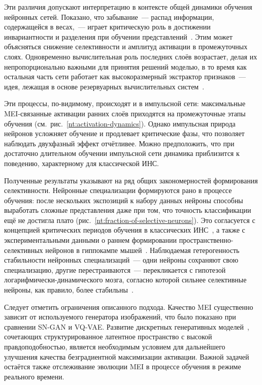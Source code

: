 Эти различия допускают интерпретацию в контексте общей динамики обучения нейронных сетей. Показано, что забывание~--- распад информации, содержащейся в весах,~--- играет критическую роль в достижении инвариантности и разделения при обучении представлений~\cite{critical-learning-periods}. Этим может объясняться снижение селективности и амплитуд активации в промежуточных слоях. Одновременно вычислительная роль последних слоёв возрастает, делая их непропорционально важными для принятия решений моделью, в то время как остальная часть сети работает как высокоразмерный экстрактор признаков~--- идея, лежащая в основе резервуарных вычислительных систем~\cite{Gauthier2021}.

Эти процессы, по-видимому, происходят и в импульсной сети: максимальные MEI-связанные активации ранних слоёв приходятся на промежуточные этапы обучения (см.~рис.~\ref{nt:activation-dynamics}). Однако импульсная природа нейронов усложняет обучение и продлевает критические фазы, что позволяет наблюдать двухфазный эффект отчётливее. Можно предположить, что при достаточно длительном обучении импульсной сети динамика приблизится к поведению, характерному для классической ИНС.

\medskip

Полученные результаты указывают на ряд общих закономерностей формирования селективности. Нейронные специализации формируются рано в процессе обучения: после нескольких экспозиций к набору данных нейроны способны выработать сложные представления даже при том, что точность классификации ещё не достигла плато (рис.~\ref{nt:fraction-of-selective-neurons}). Это согласуется с концепцией критических периодов обучения в классических ИНС~\cite{critical-learning-periods}, а также с экспериментальными данными о раннем формировании пространственно-селективных нейронов в гиппокампе мышей~\cite{Sotskov2022}. Наблюдаемая гетерогенность стабильности нейронных специализаций~--- одни нейроны сохраняют свою специализацию, другие перестраиваются~--- перекликается с гипотезой логарифмически-динамического мозга, согласно которой сильнее селективные нейроны, как правило, более стабильны~\cite{log_dynamic}.

Следует отметить ограничения описанного подхода. Качество MEI существенно зависит от используемого генератора изображений, что было показано при сравнении SN-GAN и VQ-VAE. Развитие дискретных генеративных моделей~\cite{Taming-transformers}, сочетающих структурированное латентное пространство с высокой правдоподобностью, является необходимым условием для дальнейшего улучшения качества безградиентной максимизации активации. Важной задачей остаётся также отслеживание эволюции MEI в процессе обучения в режиме реального времени.

